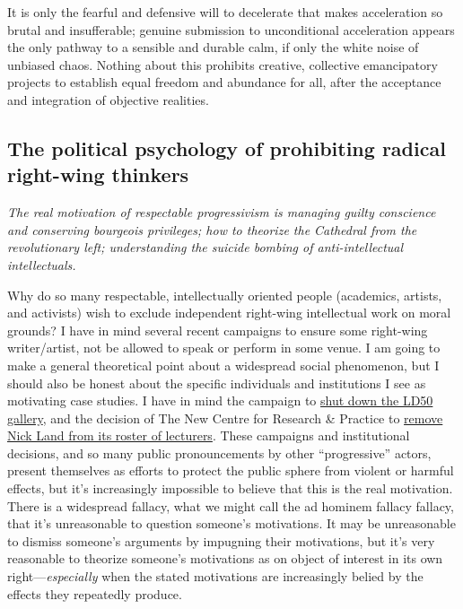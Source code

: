 \documentclass[a4paper,12pt,margin=.5in]{article}
\begin{document}
It is only the fearful and defensive will to decelerate that makes
acceleration so brutal and insufferable; genuine submission to
unconditional acceleration appears the only pathway to a sensible and
durable calm, if only the white noise of unbiased chaos. Nothing about
this prohibits creative, collective emancipatory projects to establish
equal freedom and abundance for all, after the acceptance and
integration of objective realities.

\subsection{The political psychology of prohibiting radical right-wing
thinkers}\label{the-political-psychology-of-prohibiting-radical-right-wing-thinkers}

\emph{The real motivation of respectable progressivism is managing
guilty conscience and conserving bourgeois privileges; how to theorize
the Cathedral from the revolutionary left; understanding the suicide
bombing of anti-intellectual intellectuals.}

Why do so many respectable, intellectually oriented people (academics,
artists, and activists) wish to exclude independent right-wing
intellectual work on moral grounds? I have in mind several recent
campaigns to ensure some right-wing writer/artist, not be allowed to
speak or perform in some venue. I am going to make a general theoretical
point about a widespread social phenomenon, but I should also be honest
about the specific individuals and institutions I see as motivating case
studies. I have in mind the campaign to
\href{https://shutdownld50.tumblr.com/}{shut down the LD50 gallery}, and
the decision of The New Centre for Research \& Practice to
\href{https://www.facebook.com/thenewcentre/posts/644026572465531}{remove
Nick Land from its roster of lecturers}. These campaigns and
institutional decisions, and so many public pronouncements by other
``progressive'' actors, present themselves as efforts to protect the
public sphere from violent or harmful effects, but it's increasingly
impossible to believe that this is the real motivation. There is a
widespread fallacy, what we might call the ad hominem fallacy fallacy,
that it's unreasonable to question someone's motivations. It may be
unreasonable to dismiss someone's arguments by impugning their
motivations, but it's very reasonable to theorize someone's motivations
as on object of interest in its own right---\emph{especially} when the
stated motivations are increasingly belied by the effects they
repeatedly produce.
\end{document}
